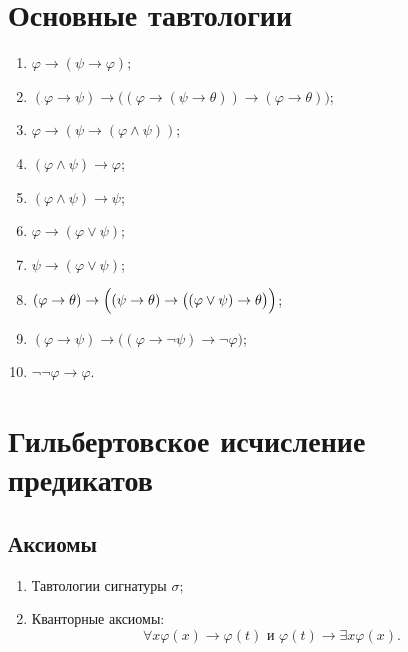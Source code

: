 \documentclass[a4paper,11pt]{article}
\begin{document}
\newpage
\section{Основные тавтологии}

\begin{enumerate}
\item $\varphi\rightarrow(\psi\rightarrow\varphi)$; 

\item $(\varphi\rightarrow\psi) \rightarrow \bigl((\varphi\rightarrow (\psi
\rightarrow \theta))\rightarrow
(\varphi \rightarrow\theta)\bigr)$;
\medskip

\item $\varphi \rightarrow (\psi\rightarrow (\varphi \land \psi))$;

\item $(\varphi
\land \psi)\rightarrow \varphi$;

\item $(\varphi \land \psi) \rightarrow\psi$; 
\medskip

\item $\varphi
\rightarrow
(\varphi \lor \psi)$;

\item $\psi \rightarrow (\varphi \lor \psi)$;

\item $(\varphi
\rightarrow \theta) \rightarrow \Bigl((\psi \rightarrow \theta)
\rightarrow \bigl((\varphi \lor \psi) \rightarrow
\theta\bigr)\Bigr)$;
\medskip

\item $(\varphi \rightarrow \psi) \rightarrow \bigl((\varphi \rightarrow
\neg\psi) \rightarrow \neg\varphi\bigr)$; 

\item $\neg\neg\varphi\rightarrow \varphi$.
\end{enumerate}
\pagebreak


\section{Гильбертовское исчисление предикатов}

\subsection{Аксиомы}

\begin{enumerate}
	\item Тавтологии сигнатуры $\sigma$;

	\item Кванторные аксиомы:
\[ \forall x \varphi(x)\rightarrow \varphi(t) \text{\ \ и\ \ } \varphi(t)\rightarrow \exists x \varphi(x). \]
\end{enumerate}
\end{document}
